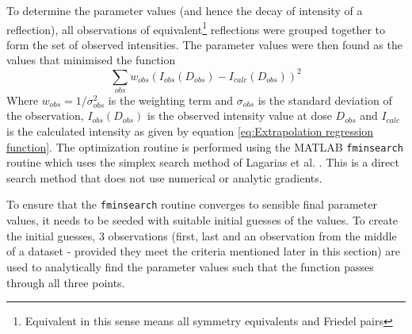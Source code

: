 To determine the parameter values (and hence the decay of intensity of a reflection), all observations of equivalent\footnote{Equivalent in this sense means all symmetry equivalents and Friedel pairs} reflections were grouped together to form the set of observed intensities.
The parameter values were then found as the values that minimised the function
\begin{equation}
\sum_{obs} w_{obs}\left(I_{obs}(D_{obs}) - I_{calc}(D_{obs}) \right)^2
\label{eq:Extrapolation objective function}
\end{equation}
Where $w_{obs} = 1/\sigma_{obs}^2$ is the weighting term and $\sigma_{obs}$ is the standard deviation of the observation, $I_{obs}(D_{obs})$ is the observed intensity value at dose $D_{obs}$ and $I_{calc}$ is the calculated intensity as given by equation \ref{eq:Extrapolation regression function}.
The optimization routine is performed using the MATLAB \verb|fminsearch| routine which uses the simplex search method of Lagarias et al. \cite{lagarias1998convergence}.
This is a direct search method that does not use numerical or analytic gradients.

To ensure that the \verb|fminsearch| routine converges to sensible final parameter values, it needs to be seeded with suitable initial guesses of the values. To create the initial guesses, 3 observations (first, last and an observation from the middle of a dataset - provided they meet the criteria mentioned later in this section) are used to analytically find the parameter values such that the function passes through all three points.

